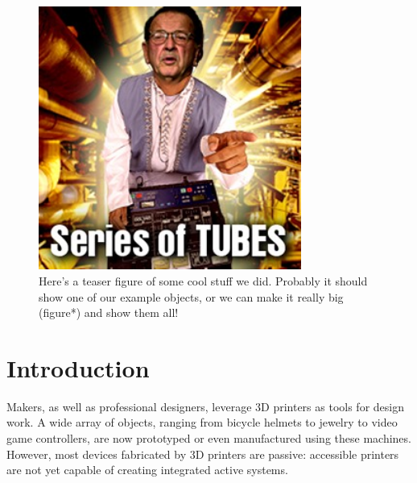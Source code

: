 \begin{figure}[h]
\centering
    \includegraphics[width=3.4in]{figures/series-of-tubes.jpg}
\caption{Here's a teaser figure of some cool stuff we did. Probably it should show one of our example objects, or we can make it really big (figure*) and show them all!}
\label{fig:teaser}
\end{figure}

\section{Introduction}
Makers, as well as professional designers, leverage 3D printers as tools for design work.  A wide array of objects, ranging from bicycle helmets to jewelry to video game controllers, are now prototyped or even manufactured using these machines.  However, most devices fabricated by 3D printers are passive: accessible printers are not yet capable of creating integrated active systems. 

